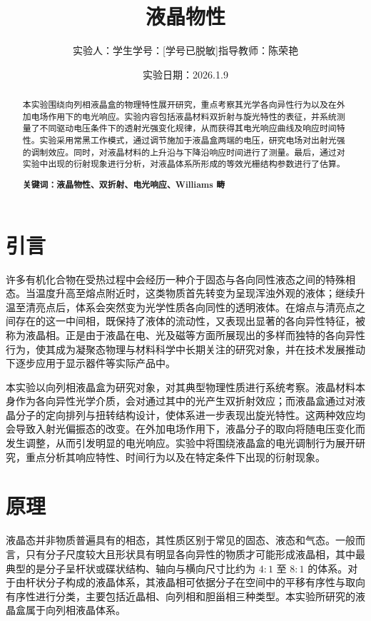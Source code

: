 \documentclass[a4paper, 1.5lines]{ctexart}
\title{液晶物性}
\author{实验人：学生\qquad 学号：[学号已脱敏]\qquad 指导教师：陈荣艳}
\date{实验日期：2026.1.9}
\begin{document}
    
    \maketitle
            
    \begin{abstract}
         本实验围绕向列相液晶盒的物理特性展开研究，重点考察其光学各向异性行为以及在外加电场作用下的电光响应。实验内容包括液晶材料双折射与旋光特性的表征，并系统测量了不同驱动电压条件下的透射光强变化规律，从而获得其电光响应曲线及响应时间特性。实验采用常黑工作模式，通过调节施加于液晶盒两端的电压，研究电场对出射光强的调制效应。同时，对液晶材料的上升沿与下降沿响应时间进行了测量。最后，通过对实验中出现的衍射现象进行分析，对液晶体系所形成的等效光栅结构参数进行了估算。
        
        \textbf{\textbf{关键词：液晶物性、双折射、电光响应、Williams 畴}}
    \end{abstract}
    
    \section{引言}
        许多有机化合物在受热过程中会经历一种介于固态与各向同性液态之间的特殊相态。当温度升高至熔点附近时，这类物质首先转变为呈现浑浊外观的液体；继续升温至清亮点后，体系会突然变为光学性质各向同性的透明液体。在熔点与清亮点之间存在的这一中间相，既保持了液体的流动性，又表现出显著的各向异性特征，被称为液晶相。正是由于液晶在电、光及磁等方面所展现出的多样而独特的各向异性行为，使其成为凝聚态物理与材料科学中长期关注的研究对象，并在技术发展推动下逐步应用于显示器件等实际产品中。

本实验以向列相液晶盒为研究对象，对其典型物理性质进行系统考察。液晶材料本身作为各向异性光学介质，会对通过其中的光产生双折射效应；而液晶盒通过对液晶分子的定向排列与扭转结构设计，使体系进一步表现出旋光特性。这两种效应均会导致入射光偏振态的改变。在外加电场作用下，液晶分子的取向将随电压变化而发生调整，从而引发明显的电光响应。实验中将围绕液晶盒的电光调制行为展开研究，重点分析其响应特性、时间行为以及在特定条件下出现的衍射现象。
    \section{原理}
       液晶态并非物质普遍具有的相态，其性质区别于常见的固态、液态和气态。一般而言，只有分子尺度较大且形状具有明显各向异性的物质才可能形成液晶相，其中最典型的是分子呈杆状或碟状结构、轴向与横向尺寸比约为 $4{:}1$ 至 $8{:}1$ 的体系。对于由杆状分子构成的液晶体系，其液晶相可依据分子在空间中的平移有序性与取向有序性进行分类，主要包括近晶相、向列相和胆甾相三种类型。本实验所研究的液晶盒属于向列相液晶体系。
\end{document}
